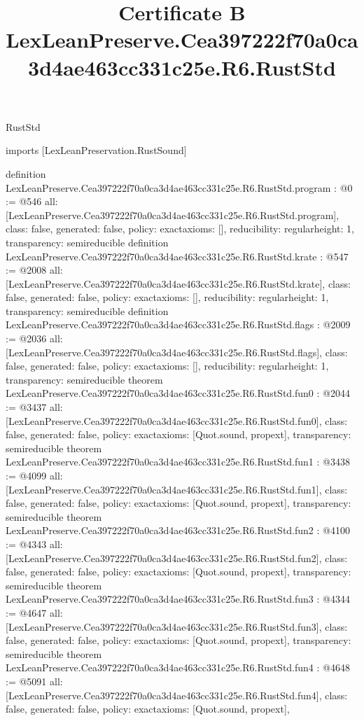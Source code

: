 \begin{lexlean}{RustStd}
\title{Certificate B LexLeanPreserve.Cea397222f70a0ca3d4ae463cc331c25e.R6.RustStd}
\begin{coremodule}
imports [LexLeanPreservation.RustSound]

definition LexLeanPreserve.Cea397222f70a0ca3d4ae463cc331c25e.R6.RustStd.program : @0 := @546 {
  all: [LexLeanPreserve.Cea397222f70a0ca3d4ae463cc331c25e.R6.RustStd.program],
  class: false,
  generated: false,
  policy: exact{axioms: []},
  reducibility: regular{height: 1},
  transparency: semireducible
}
definition LexLeanPreserve.Cea397222f70a0ca3d4ae463cc331c25e.R6.RustStd.krate : @547 := @2008 {
  all: [LexLeanPreserve.Cea397222f70a0ca3d4ae463cc331c25e.R6.RustStd.krate],
  class: false,
  generated: false,
  policy: exact{axioms: []},
  reducibility: regular{height: 1},
  transparency: semireducible
}
definition LexLeanPreserve.Cea397222f70a0ca3d4ae463cc331c25e.R6.RustStd.flags : @2009 := @2036 {
  all: [LexLeanPreserve.Cea397222f70a0ca3d4ae463cc331c25e.R6.RustStd.flags],
  class: false,
  generated: false,
  policy: exact{axioms: []},
  reducibility: regular{height: 1},
  transparency: semireducible
}
theorem LexLeanPreserve.Cea397222f70a0ca3d4ae463cc331c25e.R6.RustStd.fun0 : @2044 := @3437 {
  all: [LexLeanPreserve.Cea397222f70a0ca3d4ae463cc331c25e.R6.RustStd.fun0],
  class: false,
  generated: false,
  policy: exact{axioms: [Quot.sound, propext]},
  transparency: semireducible
}
theorem LexLeanPreserve.Cea397222f70a0ca3d4ae463cc331c25e.R6.RustStd.fun1 : @3438 := @4099 {
  all: [LexLeanPreserve.Cea397222f70a0ca3d4ae463cc331c25e.R6.RustStd.fun1],
  class: false,
  generated: false,
  policy: exact{axioms: [Quot.sound, propext]},
  transparency: semireducible
}
theorem LexLeanPreserve.Cea397222f70a0ca3d4ae463cc331c25e.R6.RustStd.fun2 : @4100 := @4343 {
  all: [LexLeanPreserve.Cea397222f70a0ca3d4ae463cc331c25e.R6.RustStd.fun2],
  class: false,
  generated: false,
  policy: exact{axioms: [Quot.sound, propext]},
  transparency: semireducible
}
theorem LexLeanPreserve.Cea397222f70a0ca3d4ae463cc331c25e.R6.RustStd.fun3 : @4344 := @4647 {
  all: [LexLeanPreserve.Cea397222f70a0ca3d4ae463cc331c25e.R6.RustStd.fun3],
  class: false,
  generated: false,
  policy: exact{axioms: [Quot.sound, propext]},
  transparency: semireducible
}
theorem LexLeanPreserve.Cea397222f70a0ca3d4ae463cc331c25e.R6.RustStd.fun4 : @4648 := @5091 {
  all: [LexLeanPreserve.Cea397222f70a0ca3d4ae463cc331c25e.R6.RustStd.fun4],
  class: false,
  generated: false,
  policy: exact{axioms: [Quot.sound, propext]},
}
\end{coremodule}
\end{lexlean}
